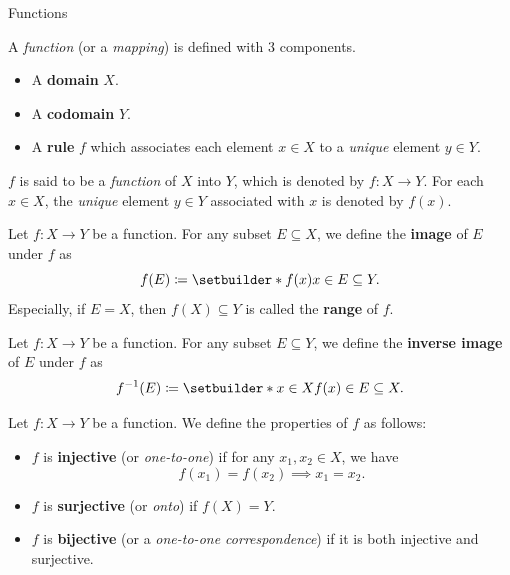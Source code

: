 \begin{section}{Functions} \label{sec:Functions}

A \emph{function} (or a \emph{mapping}) is defined with 3 components.
\begin{itemize}
    \item A \textbf{domain} $X$.
    \item A \textbf{codomain} $Y$.
    \item A \textbf{rule} $f$ which associates each element $x \in X$ to a \emph{unique} element $y \in Y$.
\end{itemize}
$f$ is said to be a \emph{function} of $X$ into $Y$, which is denoted by $f: X \to Y$.
    For each $x \in X$, the \emph{unique} element $y \in Y$ associated with $x$ is denoted by $f(x)$.

\bigskip

\begin{remark}
    Let $f: X \to Y$ be a function. For any subset $E \subseteq X$, we define the \textbf{image} of $E$ under $f$ as
    \[
    f(E) \coloneqq \setbuilder*{f(x)}{x \in E} \subseteq Y.
    \]
    Especially, if $E = X$, then $f(X) \subseteq Y$ is called the \textbf{range} of $f$.
\end{remark}

\bigskip

\begin{remark}
    Let $f: X \to Y$ be a function. For any subset $E \subseteq Y$, we define the \textbf{inverse image} of $E$ under $f$ as
    \[
    f^{-1}(E) \coloneqq \setbuilder*{x \in X}{f(x) \in E} \subseteq X.
    \]
\end{remark}

\bigskip

\begin{definition} \label{def:InjectiveSurjectiveBijective}
    Let $f: X \to Y$ be a function. We define the properties of $f$ as follows:
    \begin{itemize}
        \item $f$ is \textbf{injective} (or \emph{one-to-one}) if for any $x_1, x_2 \in X$, we have
        \[
        f(x_1) = f(x_2) \implies x_1 = x_2.
        \]
        \item $f$ is \textbf{surjective} (or \emph{onto}) if $f(X) = Y$.
        \item $f$ is \textbf{bijective} (or a \emph{one-to-one correspondence}) if it is both injective and surjective.
    \end{itemize}
\end{definition}


\end{section}
